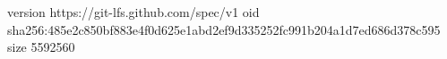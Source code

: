 version https://git-lfs.github.com/spec/v1
oid sha256:485e2c850bf883e4f0d625e1abd2ef9d335252fc991b204a1d7ed686d378c595
size 5592560
